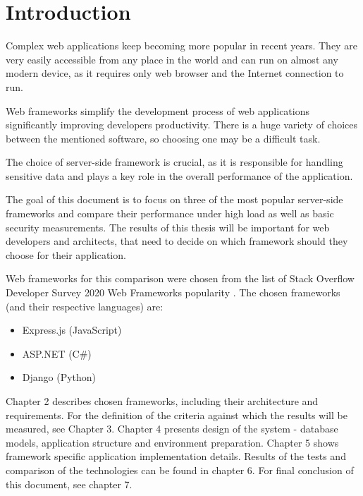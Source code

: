 
\chapter{Introduction}

Complex web applications keep becoming more popular in recent years. They are very easily accessible from any place in the world and can run on almost any modern device, as it requires only web browser and the Internet connection to run.

Web frameworks simplify the development process of web applications significantly improving developers productivity. There is a huge variety of choices between the mentioned software, so choosing one may be a difficult task.

The choice of server-side framework is crucial, as it is responsible for handling sensitive data and plays a key role in the overall performance of the application.

The goal of this document is to focus on three of the most popular server-side frameworks and compare their performance under high load as well as basic security measurements. The results of this thesis will be important for web developers and architects, that need to decide on which framework should they choose for their application.

Web frameworks for this comparison were chosen from the list of Stack Overflow Developer Survey 2020 Web Frameworks popularity \cite{devSurvey}. The chosen frameworks (and their respective languages) are:
\begin{itemize}
    \item Express.js (JavaScript)
    \item ASP.NET (C\#)
    \item Django (Python)
\end{itemize}

Chapter 2 describes chosen frameworks, including their architecture and requirements. For the definition of the criteria against which the results will be measured, see Chapter 3. Chapter 4 presents design of the system - database models, application structure and environment preparation. Chapter 5 shows framework specific application implementation details. Results of the tests and comparison of the technologies can be found in chapter 6. For final conclusion of this document, see chapter 7.
